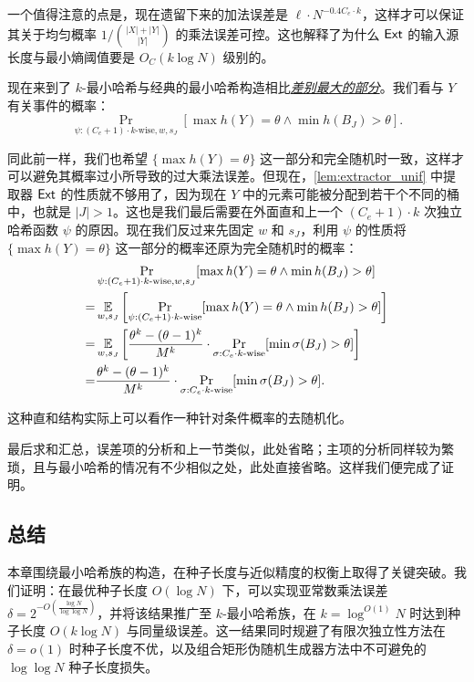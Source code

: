 一个值得注意的点是，现在遗留下来的加法误差是 $\ell \cdot N^{-0.4 C_e \cdot k}$，这样才可以保证其关于均匀概率 $1 / \binom{|X| + |Y|}{|Y|}$ 的乘法误差可控。这也解释了为什么 $\mathsf{Ext}$ 的输入源长度与最小熵阈值要是 $O_C(k \log N)$ 级别的。

现在来到了 $k$-最小哈希与经典的最小哈希构造相比\underline{\emph{差别最大的部分}}。我们看与 $Y$ 有关事件的概率：
$$
\Pr_{\psi : (C_e + 1) \cdot k\text{-wise}, w, s_J}[ \max h(Y) = \theta \wedge \min h(B_J) > \theta ].
$$

同此前一样，我们也希望 $\{\max h(Y) = \theta\}$ 这一部分和完全随机时一致，这样才可以避免其概率过小所导致的过大乘法误差。但现在，\cref{lem:extractor_unif} 中提取器 $\mathsf{Ext}$ 的性质就不够用了，因为现在 $Y$ 中的元素可能被分配到若干个不同的桶中，也就是 $|J| > 1$。这也是我们最后需要在外面直和上一个 $(C_e + 1) \cdot k$ 次独立哈希函数 $\psi$ 的原因。现在我们反过来先固定 $w$ 和 $s_J$，利用 $\psi$ 的性质将 $\{\max h(Y) = \theta\}$ 这一部分的概率还原为完全随机时的概率：
\begin{align*}
      & \Pr_{\psi : (C_e + 1) \cdot k\text{-wise}, w, s_J}[ \max h(Y) = \theta \wedge \min h(B_J) > \theta ] \\
    = & \operatorname*{\mathbb{E}}_{w, s_J}\left[ \Pr_{\psi : (C_e + 1) \cdot k\text{-wise}}[ \max h(Y) = \theta \wedge \min h(B_J) > \theta ] \right] \\
    = & \operatorname*{\mathbb{E}}_{w, s_J}\left[ \frac{\theta^k - (\theta - 1)^k}{M^k} \cdot \Pr_{\sigma : C_e \cdot k\text{-wise}}[ \min \sigma(B_J) > \theta ] \right] \\
    = & \frac{\theta^k - (\theta - 1)^k}{M^k} \cdot \Pr_{\sigma : C_e \cdot k\text{-wise}}[ \min \sigma(B_J) > \theta ].
\end{align*}

这种直和结构实际上可以看作一种针对条件概率的去随机化。

最后求和汇总，误差项的分析和上一节类似，此处省略；主项的分析同样较为繁琐，且与最小哈希的情况有不少相似之处，此处直接省略。这样我们便完成了证明。

\subsection{总结}

本章围绕最小哈希族的构造，在种子长度与近似精度的权衡上取得了关键突破。我们证明：在最优种子长度 $O(\log N)$ 下，可以实现亚常数乘法误差 $\delta = 2^{-O\left(\frac{\log N}{\log \log N}\right)}$，并将该结果推广至 $k$-最小哈希族，在 $k = \log^{O(1)}N$ 时达到种子长度 $O(k \log N)$ 与同量级误差。这一结果同时规避了有限次独立性方法在 $\delta = o(1)$ 时种子长度不优，以及组合矩形伪随机生成器方法中不可避免的 $\log \log N$ 种子长度损失。

